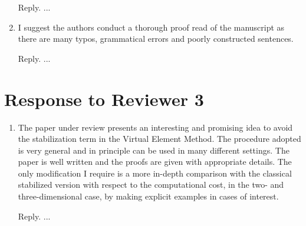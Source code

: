 \documentclass[10pt]{amsart}
\theoremstyle{definition}
\theoremstyle{remark}
\begin{document}
\begin{enumerate}[1.]
\smallskip \noindent \textcolor[rgb]{1.00,0.00,0.00}{Reply.}
...

\medskip

\item \textsf{I suggest the authors conduct a thorough proof read of the manuscript as there are many typos, grammatical errors and poorly constructed sentences.}

\smallskip \noindent \textcolor[rgb]{1.00,0.00,0.00}{Reply.}
...




\end{enumerate}


\section{Response to Reviewer 3}

\begin{enumerate}[1.]
\item \textsf{The paper under review presents an interesting and promising idea to avoid the stabilization term in the Virtual Element Method. The procedure adopted is very general and in principle can be used in many different settings. The paper is well written and the proofs are given with appropriate details. 
The only modification I require is a more in-depth comparison with the classical stabilized version with respect to the computational cost, in the two- and three-dimensional case, by making explicit examples in cases of interest.}

\smallskip \noindent \textcolor[rgb]{1.00,0.00,0.00}{Reply.}
...




\end{enumerate}





\end{document}
